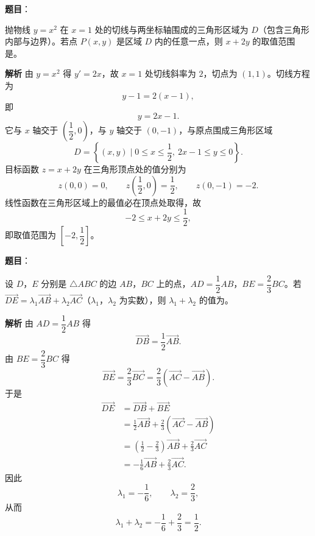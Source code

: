 \begin{answer}

\textbf{题目}：

抛物线 $y=x^2$ 在 $x=1$ 处的切线与两坐标轴围成的三角形区域为 $D$（包含三角形内部与边界）。若点 $P(x,y)$ 是区域 $D$ 内的任意一点，则 $x+2y$ 的取值范围是\gkblank{}。

\textbf{解析}
由 $y=x^2$ 得 $y'=2x$，故 $x=1$ 处切线斜率为 $2$，切点为 $(1,1)$。切线方程为
\nopagebreak[4]
\[y-1=2(x-1),\]
即
\nopagebreak[4]
\[y=2x-1.\]
它与 $x$ 轴交于 $\left(\dfrac12,0\right)$，与 $y$ 轴交于 $(0,-1)$，与原点围成三角形区域
\nopagebreak[4]
\[D=\left\{(x,y)\mid 0\leqslant x\leqslant\frac12,\ 2x-1\leqslant y\leqslant0\right\}.\]
目标函数 $z=x+2y$ 在三角形顶点处的值分别为
\nopagebreak[4]
\[z(0,0)=0,\qquad z\left(\frac12,0\right)=\frac12,\qquad z(0,-1)=-2.\]
线性函数在三角形区域上的最值必在顶点处取得，故
\nopagebreak[4]
\[-2\leqslant x+2y\leqslant\frac12,\]
即取值范围为 $\left[-2,\dfrac12\right]$。


\end{answer}
\begin{answer}

\textbf{题目}：

设 $D$，$E$ 分别是 $\triangle ABC$ 的边 $AB$，$BC$ 上的点，$AD=\dfrac12AB$，$BE=\dfrac23BC$。若 $\overrightarrow{DE}=\lambda_1\overrightarrow{AB}+\lambda_2\overrightarrow{AC}$（$\lambda_1$，$\lambda_2$ 为实数），则 $\lambda_1+\lambda_2$ 的值为\gkblank{}。

\textbf{解析}
由 $AD=\dfrac12AB$ 得
\nopagebreak[4]
\[\overrightarrow{DB}=\frac12\overrightarrow{AB}.\]
由 $BE=\dfrac23BC$ 得
\nopagebreak[4]
\[\overrightarrow{BE}=\frac23\overrightarrow{BC}=\frac23\left(\overrightarrow{AC}-\overrightarrow{AB}\right).\]
于是
\nopagebreak[4]
\[\begin{aligned}
\overrightarrow{DE}
&=\overrightarrow{DB}+\overrightarrow{BE}\\
&=\frac12\overrightarrow{AB}+\frac23\left(\overrightarrow{AC}-\overrightarrow{AB}\right)\\
&=\left(\frac12-\frac23\right)\overrightarrow{AB}+\frac23\overrightarrow{AC}\\
&=-\frac16\overrightarrow{AB}+\frac23\overrightarrow{AC}.
\end{aligned}\]
因此
\nopagebreak[4]
\[\lambda_1=-\frac16,\qquad \lambda_2=\frac23,\]
从而
\nopagebreak[4]
\[\lambda_1+\lambda_2=-\frac16+\frac23=\frac12.\]


\end{answer}

